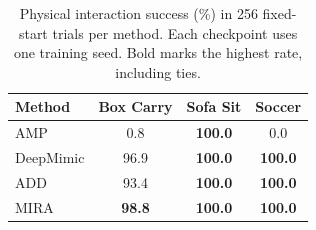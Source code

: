 \begin{table}[!htbp]
\caption{Physical interaction success (\%) in 256 fixed-start trials per method.
Each checkpoint uses one training seed. Bold marks the highest rate, including ties.}
\label{tab:interaction}
\centering\small
\setlength{\tabcolsep}{5pt}
\begin{tabular}{lccc}\toprule
Method & Box Carry & Sofa Sit & Soccer \\
\midrule
AMP & 0.8 & \textbf{100.0} & 0.0 \\
DeepMimic & 96.9 & \textbf{100.0} & \textbf{100.0} \\
ADD & 93.4 & \textbf{100.0} & \textbf{100.0} \\
MIRA & \textbf{98.8} & \textbf{100.0} & \textbf{100.0} \\
\bottomrule\end{tabular}
\end{table}
